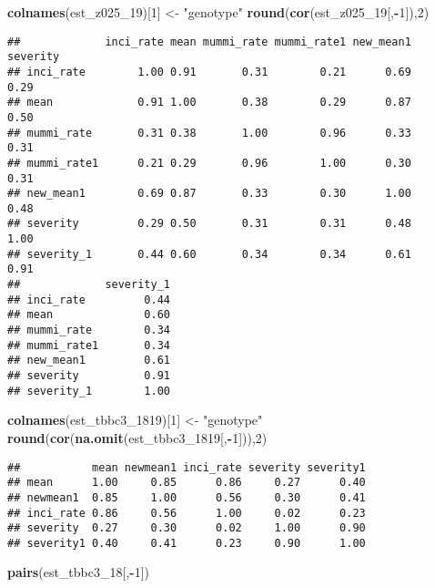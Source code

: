 \documentclass[]{article}
\newenvironment{Shaded}{\begin{snugshade}}{\end{snugshade}}
\newcommand{\DecValTok}[1]{\textcolor[rgb]{0.00,0.00,0.81}{#1}}
\newcommand{\KeywordTok}[1]{\textcolor[rgb]{0.13,0.29,0.53}{\textbf{#1}}}
\newcommand{\NormalTok}[1]{#1}
\newcommand{\OperatorTok}[1]{\textcolor[rgb]{0.81,0.36,0.00}{\textbf{#1}}}
\newcommand{\StringTok}[1]{\textcolor[rgb]{0.31,0.60,0.02}{#1}}
\begin{document}
\begin{Shaded}
\begin{Highlighting}[]
\KeywordTok{colnames}\NormalTok{(est_z025_}\DecValTok{19}\NormalTok{)[}\DecValTok{1}\NormalTok{] <-}\StringTok{ "genotype"}
\KeywordTok{round}\NormalTok{(}\KeywordTok{cor}\NormalTok{(est_z025_}\DecValTok{19}\NormalTok{[,}\OperatorTok{-}\DecValTok{1}\NormalTok{]),}\DecValTok{2}\NormalTok{)}
\end{Highlighting}
\end{Shaded}

\begin{verbatim}
##             inci_rate mean mummi_rate mummi_rate1 new_mean1 severity
## inci_rate        1.00 0.91       0.31        0.21      0.69     0.29
## mean             0.91 1.00       0.38        0.29      0.87     0.50
## mummi_rate       0.31 0.38       1.00        0.96      0.33     0.31
## mummi_rate1      0.21 0.29       0.96        1.00      0.30     0.31
## new_mean1        0.69 0.87       0.33        0.30      1.00     0.48
## severity         0.29 0.50       0.31        0.31      0.48     1.00
## severity_1       0.44 0.60       0.34        0.34      0.61     0.91
##             severity_1
## inci_rate         0.44
## mean              0.60
## mummi_rate        0.34
## mummi_rate1       0.34
## new_mean1         0.61
## severity          0.91
## severity_1        1.00
\end{verbatim}

\begin{Shaded}
\begin{Highlighting}[]
\KeywordTok{colnames}\NormalTok{(est_tbbc3_}\DecValTok{1819}\NormalTok{)[}\DecValTok{1}\NormalTok{] <-}\StringTok{ "genotype"}
\KeywordTok{round}\NormalTok{(}\KeywordTok{cor}\NormalTok{(}\KeywordTok{na.omit}\NormalTok{(est_tbbc3_}\DecValTok{1819}\NormalTok{[,}\OperatorTok{-}\DecValTok{1}\NormalTok{])),}\DecValTok{2}\NormalTok{)}
\end{Highlighting}
\end{Shaded}

\begin{verbatim}
##           mean newmean1 inci_rate severity severity1
## mean      1.00     0.85      0.86     0.27      0.40
## newmean1  0.85     1.00      0.56     0.30      0.41
## inci_rate 0.86     0.56      1.00     0.02      0.23
## severity  0.27     0.30      0.02     1.00      0.90
## severity1 0.40     0.41      0.23     0.90      1.00
\end{verbatim}

\begin{Shaded}
\begin{Highlighting}[]
\KeywordTok{pairs}\NormalTok{(est_tbbc3_}\DecValTok{18}\NormalTok{[,}\OperatorTok{-}\DecValTok{1}\NormalTok{])}
\end{Highlighting}
\end{Shaded}
\end{document}
